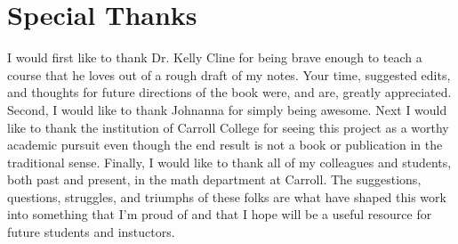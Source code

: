 \section{Special Thanks}
I would first like to thank Dr. Kelly Cline for being brave enough to teach a course that
he loves out of a rough draft of my notes.  Your time, suggested edits, and thoughts for
future directions of the book were, and are, greatly appreciated.  Second, I would like to
thank Johnanna for simply being awesome.  Next I would like to thank the institution
of Carroll College for seeing this project as a worthy academic pursuit even though the
end result is not a book or publication in the traditional sense.  Finally, I would like
to thank all of my colleagues and students, both past and present, in the math department
at Carroll.  The suggestions, questions, struggles, and triumphs of these folks are what
have shaped this work into something that I'm proud of and that I hope will be a useful
resource for future students and instuctors.
